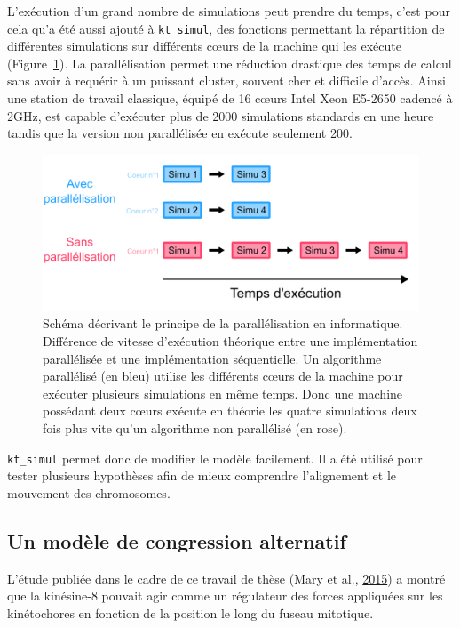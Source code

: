\documentclass[12pt,a4paper,twoside,openright]{book}
\begin{document}
L'exécution d'un grand nombre de simulations peut prendre du temps,
c'est pour cela qu'a été aussi ajouté à \texttt{kt\_simul}, des
fonctions permettant la répartition de différentes simulations sur
différents cœurs de la machine qui les exécute
(Figure~\ref{fig:parallel}). La parallélisation permet une réduction
drastique des temps de calcul sans avoir à requérir à un puissant
cluster, souvent cher et difficile d'accès. Ainsi une station de travail
classique, équipé de 16 cœurs Intel Xeon E5-2650 cadencé à 2GHz, est
capable d'exécuter plus de 2000 simulations standards en une heure
tandis que la version non parallélisée en exécute seulement 200.

\begin{figure}[htbp]
\centering
\includegraphics{figures/results/modelling/parallel.png}
\caption[Schéma décrivant le principe de la parallélisation en informatique]{\label{fig:parallel}Schéma
décrivant le principe de la parallélisation en informatique. Différence
de vitesse d'exécution théorique entre une implémentation parallélisée
et une implémentation séquentielle. Un algorithme parallélisé (en bleu)
utilise les différents cœurs de la machine pour exécuter plusieurs
simulations en même temps. Donc une machine possédant deux cœurs exécute
en théorie les quatre simulations deux fois plus vite qu'un algorithme
non parallélisé (en rose).}
\end{figure}

\texttt{kt\_simul} permet donc de modifier le modèle facilement. Il a
été utilisé pour tester plusieurs hypothèses afin de mieux comprendre
l'alignement et le mouvement des chromosomes.

\subsection{Un modèle de congression
alternatif}\label{un-moduxe8le-de-congression-alternatif}

L'étude publiée dans le cadre de ce travail de thèse (Mary et al.,
\hyperref[ref-Mary2015]{2015}) a montré que la kinésine-8 pouvait agir
comme un régulateur des forces appliquées sur les kinétochores en
fonction de la position le long du fuseau mitotique.
\end{document}

